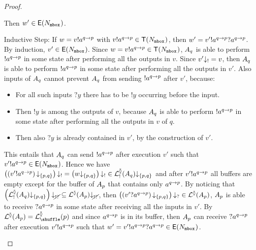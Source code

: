 \documentclass[submission,copyright,creativecommons,UKenglish]{eptcs}
\begin{document}
\begin{proof}
\begin{compactdesc}
\begin{compactdesc}
\begin{compactdesc}
							Then $ w' \in \mathsf{E}(N_{{\mathtt{mbox}}^{ }}) $.
						\item[Inductive Step:] If $ w = v !a^{q \rightarrow p} $ with $ v !a^{q \rightarrow p} \in \mathsf{T}(N_{{\mathtt{mbox}}^{ }}) $, then $ w' = v' !a^{q \rightarrow p} ?a^{q \rightarrow p} $.
							By  induction, $ v' \in \mathsf{E}(N_{{\mathtt{mbox}}^{ }}) $.
							Since $ w = v !a^{q \rightarrow p} \in \mathsf{T}(N_{{\mathtt{mbox}}^{ }}) $, $ A_{q} $ is able to perform $ !a^{q \rightarrow p} $ in some state after performing all the outputs in $ v $.
							Since $ v' {\downarrow_{!}} = v $, then $ A_{q} $ is able to perform $ !a^{q \rightarrow p} $ in some state after performing all the outputs in $ v' $.
							Also inputs of $ A_{q} $ cannot prevent $ A_{q} $ from sending $ !a^{q \rightarrow p} $ after $ v' $, because:
							\begin{itemize}
								\item For all such inputs $ ?y $ there has to be $ !y $ occurring before the input.
								\item Then $ !y $ is among the outputs of $ v $, because $ A_{q} $ is able to perform $ !a^{q \rightarrow p} $ in some state after performing all the outputs in $ v $ of $ q $.
								\item Then also $ ?y $ is already contained in $ v' $, by the construction of $ v' $.
							\end{itemize}
							This entails that  $ A_{q} $ can send $ !a^{q \rightarrow p} $ after execution $ v' $ such that $ v' !a^{q \rightarrow p} \in \mathsf{E}(N_{{\mathtt{mbox}}^{ }}) $.
							Hence we have $ \left( \left( v' !a^{q \rightarrow p} \right) {\downarrow_{{\left\lbrace p, q \right\rbrace}}} \right) {\downarrow_{!}} = \left( w {\downarrow_{{\left\lbrace p, q \right\rbrace}}} \right) {\downarrow_{!}} \in \mathcal{L}_{!}^{\between}{\left( A_{q} \right)} {\downarrow_{{\left\lbrace p, q \right\rbrace}}} $ and after $ v' !a^{q \rightarrow p} $ all buffers are empty except for the buffer of $ A_{p} $ that contains only $ a^{q \rightarrow p} $.
							By noticing that $ \left( \mathcal{L}_{!}^{\between}{\left( A_{q} \right)}{\downarrow_{{\left\lbrace p, q \right\rbrace}}} \right){\downarrow_{\cancel{!?}}} \subseteq \mathcal{L}^{\between}{\left( A_{p} \right)}{\downarrow_{\cancel{!?}}} $, then $ \left( \left( v' ?a^{q \rightarrow p} \right) {\downarrow_{{\left\lbrace p, q \right\rbrace}}} \right) {\downarrow_{?}} \in \mathcal{L}^{\between}{\left( A_{p} \right)} $, \ie $ A_{p} $ is able to receive $ ?a^{q \rightarrow p} $ in some state after receiving all the inputs in $ v' $.
							By $ \LangTree{\Automaton{p}} = \LangShuffle{p} $ and since $ a^{q \rightarrow p} $ is in its buffer, then $ A_{p} $ can receive $ ?a^{q \rightarrow p} $ after execution $ v' !a^{q \rightarrow p} $ such that $ w' = v' !a^{q \rightarrow p} ?a^{q \rightarrow p} \in \mathsf{E}(N_{{\mathtt{mbox}}^{ }}) $.

\end{compactdesc}
\end{compactdesc}
\end{compactdesc}
\end{proof}
\end{document}

